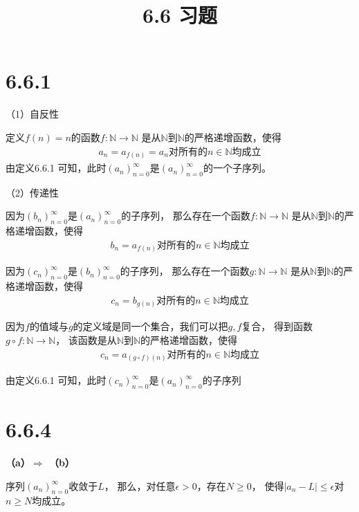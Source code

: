 \documentclass{article}
\theoremstyle{mystyle}
\begin{document}
\title{6.6 习题}
\maketitle

\section*{6.6.1}

（1）自反性

定义$f(n)=n$的函数$f : \mathbb{N} \rightarrow \mathbb{N}$
是从$\mathbb{N}$到$\mathbb{N}$的严格递增函数，使得
\begin{align*}
  a_n = a_{f(n)} = a_n \text{对所有的$n \in \mathbb{N}$均成立}
\end{align*}
由定义6.6.1 可知，此时$(a_n)_{n=0}^\infty$是$(a_n)_{n=0}^\infty$的一个子序列。

（2）传递性

因为$(b_n)_{n=0}^\infty$是$(a_n)_{n=0}^\infty$的子序列，
那么存在一个函数$f : \mathbb{N} \rightarrow \mathbb{N}$
是从$\mathbb{N}$到$\mathbb{N}$的严格递增函数，使得
\begin{align*}
  b_n = a_{f(n)} \text{对所有的$n \in \mathbb{N}$均成立}
\end{align*}

因为$(c_n)_{n=0}^\infty$是$(b_n)_{n=0}^\infty$的子序列，
那么存在一个函数$g : \mathbb{N} \rightarrow \mathbb{N}$
是从$\mathbb{N}$到$\mathbb{N}$的严格递增函数，使得
\begin{align*}
  c_n = b_{g(n)} \text{对所有的$n \in \mathbb{N}$均成立}
\end{align*}

因为$f$的值域与$g$的定义域是同一个集合，我们可以把$g,f$复合，
得到函数$g \circ f : \mathbb{N} \rightarrow \mathbb{N}$，
该函数是从$\mathbb{N}$到$\mathbb{N}$的严格递增函数，使得
\begin{align*}
  c_n = a_{(g \circ f)(n)} \text{对所有的$n \in \mathbb{N}$均成立}
\end{align*}

由定义6.6.1 可知，此时$(c_n)_{n=0}^\infty$是$(a_n)_{n=0}^\infty$的子序列

\section*{6.6.4}

\textbf{（a）$\Rightarrow$ （b）}

序列$(a_n)_{n=0}^\infty$收敛于$L$，
那么，对任意$\epsilon > 0$，存在$N \geq 0$，
使得$|a_n - L| \leq \epsilon$对$n \geq N$均成立。
\end{document}
